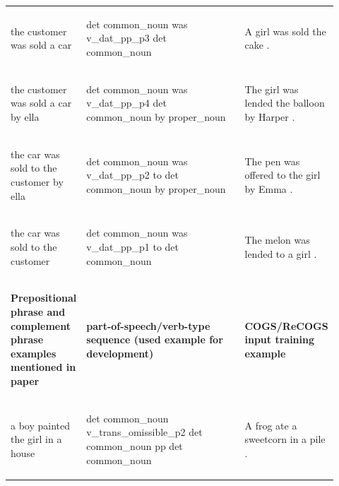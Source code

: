 \documentclass[11pt]{article}
\begin{document}
\begin{table}
\begin{tabular}{p{0.2\linewidth} p{0.52\linewidth} p{0.2\linewidth}}
\begin{small}the customer was sold a car\end{small} & \begin{small}det common\_noun was v\_dat\_pp\_p3 det common\_noun \end{small} & \begin{small}A girl was sold the cake .\end{small} \\
\begin{small}the customer was sold a car by ella\end{small} & \begin{small}det common\_noun was v\_dat\_pp\_p4 det common\_noun by proper\_noun \end{small} & \begin{small}The girl was lended the balloon by Harper .\end{small} \\
\begin{small}the car was sold to the customer by ella\end{small} & \begin{small}det common\_noun was v\_dat\_pp\_p2 to det common\_noun by proper\_noun \end{small} & \begin{small}The pen was offered to the girl by Emma .\end{small} \\
\begin{small}the car was sold to the customer\end{small} & \begin{small}det common\_noun was v\_dat\_pp\_p1 to det common\_noun \end{small} & \begin{small}The melon was lended to a girl .\end{small} \\
\hline
\begin{small}\textbf{Prepositional phrase and complement phrase examples mentioned in paper}\end{small} & \begin{small}\textbf{part-of-speech/verb-type sequence (used example for development)}\end{small} & \begin{small}\textbf{COGS/ReCOGS input training example}\end{small} \\
\hline
\begin{small}a boy painted the girl in a house\end{small} & \begin{small}det common\_noun v\_trans\_omissible\_p2 det common\_noun pp det common\_noun\end{small} & \begin{small}A frog ate a sweetcorn in a pile .\end{small} \\

\end{tabular}
\end{table}
\end{document}
